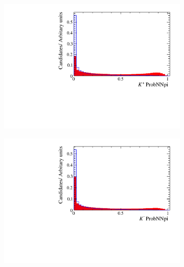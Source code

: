 \begin{figure}[!h]
\begin{subfigure}[t]{0.22\textwidth}
   \end{subfigure}
   \begin{subfigure}[t]{0.22\textwidth}
      \centering
      \includegraphics[width=1.0\textwidth]{figs/Selection/Ds_BDT_Var_Ds2KKPi_D_K0_MC15TuneV1_ProbNNpi.pdf}
   \end{subfigure}
   \begin{subfigure}[t]{0.22\textwidth}
      \centering
      \includegraphics[width=1.0\textwidth]{figs/Selection/Ds_BDT_Var_Ds2KKPi_D_K1_MC15TuneV1_ProbNNpi.pdf}
   \end{subfigure}
   \begin{subfigure}[t]{0.22\textwidth}
      \centering

\end{subfigure}
\end{figure}
